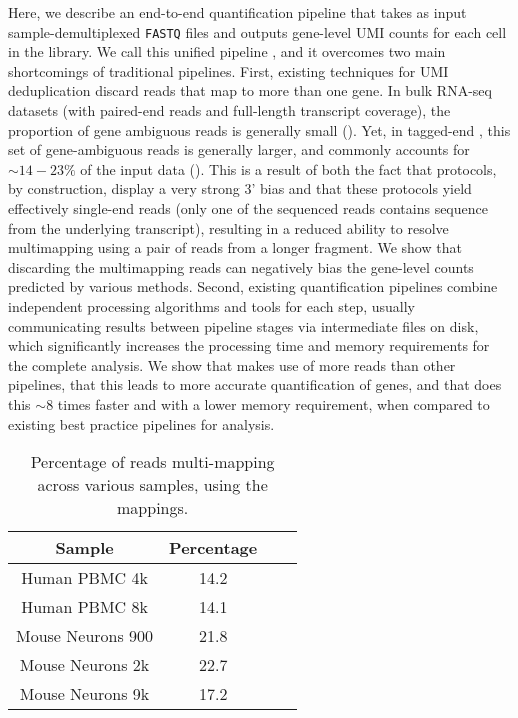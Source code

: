 Here, we describe an end-to-end quantification pipeline that takes as input sample-demultiplexed \texttt{FASTQ} files and outputs gene-level UMI counts for each cell in the library. We call this unified pipeline \alevin, and it overcomes two main shortcomings of traditional pipelines. First, existing techniques for UMI deduplication discard reads that map to more than one gene. In bulk RNA-seq datasets (with paired-end reads and full-length transcript coverage), the proportion of gene ambiguous reads is generally small ().  Yet, in tagged-end \scrnaseq, this set of gene-ambiguous reads is generally larger, and commonly accounts for $\sim 14-23\%$ of the input data (). 
This is a result of both the fact that \dscrnaseq protocols, by construction, display a very strong 3' bias and that these protocols yield effectively single-end reads (only one of the sequenced reads contains sequence from the underlying transcript), resulting in a reduced ability to resolve multimapping using a pair of reads from a longer fragment.
We show that discarding the multimapping reads can negatively bias the gene-level counts predicted by various methods. Second, existing quantification pipelines combine independent processing algorithms and tools for each step, usually communicating results between pipeline stages via intermediate files on disk, which significantly increases the processing time and memory requirements for the complete analysis. We show that \alevin makes use of more reads than other pipelines, that this leads to more accurate quantification of genes, and that \alevin does this $\sim8$ times faster and with a lower memory requirement, when compared to existing best practice pipelines for \dscrnaseq analysis.

\begin{table}[!htb]
\centering
\caption{Percentage of reads multi-mapping across various \scrnaseq samples, using the \alevin mappings.}
      \begin{tabular}{cccc}
        \hline
           Sample & Percentage \\ \hline
           Human PBMC 4k & 14.2 \\
           Human PBMC 8k & 14.1 \\
           Mouse Neurons 900 & 21.8 \\
           Mouse Neurons 2k & 22.7 \\
           Mouse Neurons 9k & 17.2 \\ \hline
      \end{tabular}
      \label{suptab:scmmRate}
\end{table}

